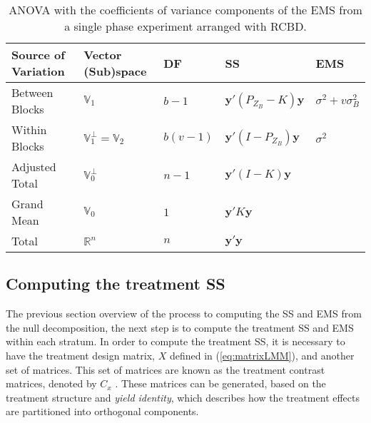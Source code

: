 \documentclass[article]{jss}
\begin{document}
\begin{table}[ht]
\centering
\caption{ANOVA with the coefficients of variance components of the EMS from a single phase experiment arranged with RCBD.}
\begin{tabular}[t]{lllll}
\toprule
 \multicolumn{1}{l}{\bf Source of Variation}& \multicolumn{1}{l}{\bf Vector (Sub)space} & \multicolumn{1}{l}{\bf DF} & \multicolumn{1}{l}{\bf SS} & \multicolumn{1}{l}{\bf EMS}\\
\midrule
Between Blocks 	& $\mathbb{V}_1$ &$b-1$ & $\bm{y}'(P_{Z_B}-K)\bm{y}$	& $\sigma^2 + v\sigma_{B}^2$\\
Within Blocks 	& $\mathbb{V}^{\perp}_1 = \mathbb{V}_2$	&$b(v - 1)$ & $\bm{y}'(I - P_{Z_B})\bm{y}$  & $\sigma^2$\\
\hline
Adjusted Total	& $\mathbb{V}^{\perp}_0$	& $n - 1$ & $\bm{y}'(I - K)\bm{y}$ \\
\hline
Grand Mean	& $\mathbb{V}_0$	& $1$ & $\bm{y}'K\bm{y}$ \\
\midrule
Total 	& $\mathbb{R}^n$	& $n$ & $\bm{y}'\bm{y}$ \\
\bottomrule
\end{tabular}
\label{tab:infoDecomp}
\end{table}

\subsection{Computing the treatment SS}
\label{subsec:estTrt}
The previous section overview of the process to computing the SS and EMS from the null decomposition, the next step is to compute the treatment SS and EMS within each stratum. In order to compute the treatment SS, it is necessary to have the treatment design matrix, $X$ defined in (\ref{eq:matrixLMM}), and another set of matrices. This set of matrices are known as the treatment contrast matrices, denoted by $C_x$ \citep{John1987}. These matrices can be generated, based on the treatment structure and \emph{yield identity}, which describes how the treatment effects are partitioned into orthogonal components. 
\end{document}
